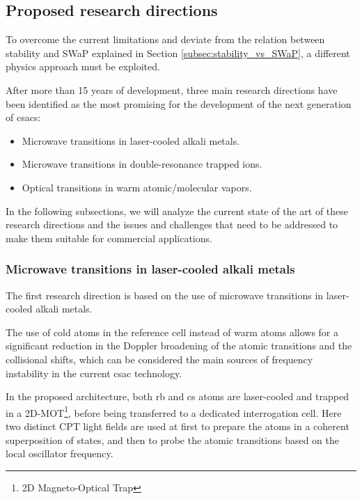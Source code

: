 \subsection{Proposed research directions}
\label{subsec:proposed_research_directions}

To overcome the current limitations and deviate from the relation between stability and SWaP explained in Section \ref{subsec:stability_vs_SWaP}, a different physics approach must be exploited.

After more than 15 years of development, three main research directions have been identified as the most promising for the development of the next generation of \acrshort{csacs}:

\begin{itemize}
    \item Microwave transitions in laser-cooled alkali metals.
    \item Microwave transitions in double-resonance trapped ions.
    \item Optical transitions in warm atomic/molecular vapors.
\end{itemize}

In the following subsections, we will analyze the current state of the art of these research directions and the issues and challenges that need to be addressed to make them suitable for commercial applications.


\subsubsection{Microwave transitions in laser-cooled alkali metals}
\label{subsubsec:laser_cooled_alkali}

The first research direction is based on the use of microwave transitions in laser-cooled alkali metals.

The use of cold atoms in the reference cell instead of warm atoms allows for a significant reduction in the Doppler broadening of the atomic transitions and the collisional shifts, which can be considered the main sources of frequency instability in the current \acrshort{csac} technology.

In the proposed architecture, both \acrshort{rb} and \acrshort{cs} atoms are laser-cooled and trapped in a 2D-MOT\footnote{2D Magneto-Optical Trap}, before being transferred to a dedicated interrogation cell.
Here two distinct CPT light fields are used at first to prepare the atoms in a coherent superposition of states, and then to probe the atomic transitions based on the local oscillator frequency.

